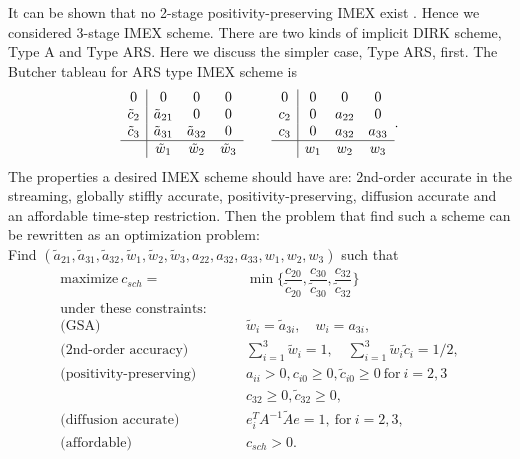 It can be shown that no 2-stage positivity-preserving IMEX exist \cite{hu_etal_2017}.
Hence we considered 3-stage IMEX scheme.
There are two kinds of implicit DIRK scheme, Type A and Type ARS.
Here we discuss the simpler case, Type ARS, first.
The Butcher tableau for ARS type IMEX scheme is
\begin{equation}
  \begin{array}{c | c c c}
  	         0           & 0                    & 0                    & 0                    \\
  	\tilde{c}_{2} & \tilde{a}_{21}       & 0                    & 0                    \\
  	\tilde{c}_{3} & \tilde{a}_{31}       & \tilde{a}_{32}       & 0                    \\ \hline
  	                     & \tilde{w}_{1} & \tilde{w}_{2} & \tilde{w}_{3}
  \end{array}
  \qquad
  \begin{array}{c | c c c}
  	     0       & 0            & 0            & 0            \\
  	c_{2} & 0            & a_{22}       & 0            \\
  	c_{3} & 0            & a_{32}       & a_{33}       \\ \hline
  	             & w_{1} & w_{2} & w_{3}
  \end{array}.
\end{equation}
The properties a desired IMEX scheme should have are: 2nd-order accurate in the streaming, globally stiffly accurate, positivity-preserving, diffusion accurate and an affordable time-step restriction.
Then the problem that find such a scheme can be rewritten as an optimization problem:\\
Find $(\tilde{a}_{21}, \tilde{a}_{31}, \tilde{a}_{32}, \tilde{w}_{1}, \tilde{w}_{2}, \tilde{w}_{3}, a_{22}, a_{32}, a_{33}, w_{1}, w_{2}, w_{3})$ such that
\begin{align*}
\text{maximize} ~ c_{sch} = &\min \{ \dfrac{c_{20}}{\tilde{c}_{20}}, \dfrac{c_{30}}{\tilde{c}_{30}}, \dfrac{c_{32}}{\tilde{c}_{32}}\}\\
 \text{under these constraints:} \qquad & \\
 \text{(GSA)} \qquad\ &\tilde{w}_{i} = \tilde{a}_{3i}, \quad w_{i} = a_{3i},\\
 \text{(2nd-order accuracy)} \qquad\ &\sum_{i=1}^{3}  \tilde{w}_{i} = 1, \quad \sum_{i=1}^{3}  \tilde{w}_{i}\tilde{c}_{i} = 1/2, \\
 \text{(positivity-preserving)} \qquad & a_{ii} > 0, c_{i0} \geq 0, \tilde{c}_{i0} \geq 0 ~\text{for} ~ i = 2,3 \\
 & c_{32} \geq 0, \tilde{c}_{32} \geq 0, \\
 \text{(diffusion accurate)} \qquad & e^{T}_iA^{-1}\tilde{A}e = 1, ~\text{for} ~ i = 2,3, \\
 \text{(affordable)} \qquad & c_{sch} > 0.
\end{align*}
